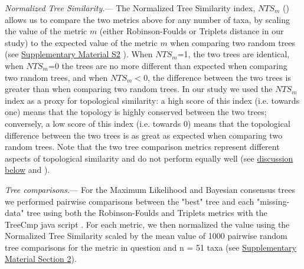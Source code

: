 \documentclass[12pt,letterpaper]{article}
\renewcommand{\subsubsection}[1]{%
\vspace{2ex}
\noindent
\textit{#1.}---}
\begin{document}
\subsubsection{Normalized Tree Similarity}
The Normalized Tree Similarity index, $NTS_m$ (\citealp{Bogdanowicz2012}) allows us to compare the two metrics above for any number of taxa, by scaling the value of the metric $m$ (either Robinson-Foulds or Triplets distance in our study) to the expected value of the metric $m$ when comparing two random trees (see \hyperref[SupplementaryMaterial]{Supplementary Material S2}
). When $NTS_m$=1, the two trees are identical, when $NTS_m$=0 the trees are no more different than expected when comparing two random trees, and when $NTS_m$$<$0, the difference between the two trees is greater than when comparing two random trees. In our study we used the $NTS_m$ index as a proxy for topological similarity: a high score of this index (i.e. towards one) means that the topology is highly conserved between the two trees; conversely, a low score of this index (i.e. towards 0) means that the topological difference between the two trees is as great as expected when comparing two random trees. Note that the two tree comparison metrics represent different aspects of topological similarity and do not perform equally well (see \hyperref[metrics_discussion]{discussion below} and \citealt{kuhnerpractical2014}).


\subsubsection{Tree comparisons} %
\label{tree_comparisons}
For the Maximum Likelihood and Bayesian consensus trees we performed pairwise comparisons between the "best" tree and each "missing-data" tree using both the Robinson-Foulds and Triplets metrics with the TreeCmp java script \citep{Bogdanowicz2012}. For each metric, we then normalized the value using the Normalized Tree Similarity scaled by the mean value of 1000 pairwise random tree comparisons for the metric in question and n = 51 taxa (see \hyperref[SupplementaryMaterial]{Supplementary Material Section 2}). %
\end{document}
